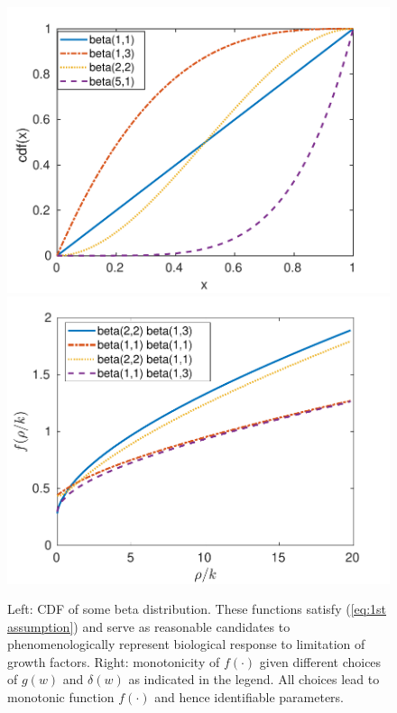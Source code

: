 \documentclass{aims}
\numberwithin{equation}{section}
\begin{document}
\begin{figure}
\begin{center}
\includegraphics[scale=0.5]{plots/frhok/betas-new}\includegraphics[scale=0.5]{plots/frhok/frhok-new}
\end{center}
\caption{\label{fig:beta =000026 f}Left: CDF of some beta distribution. These functions satisfy (\ref{eq:1st assumption})  and serve as reasonable candidates to phenomenologically represent biological response to limitation of growth factors. Right:
monotonicity of $f(\cdot)$ given different choices of $g(w)$ and $\delta(w)$ as indicated in the legend. All choices lead to monotonic function $f(\cdot)$ and hence identifiable parameters.}
\end{figure}
\end{document}
